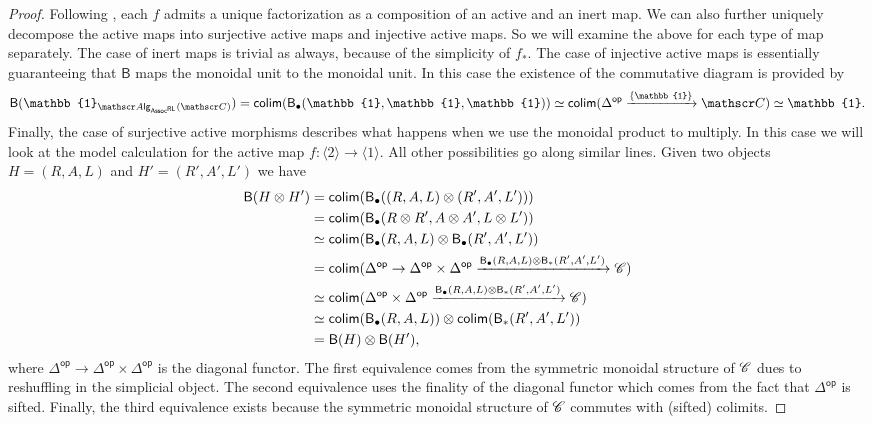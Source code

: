 \documentclass[../text]{subfiles}
\begin{document}
\begin{proof}
    Following \cite[rem.2.1.2.2]{lurie_ha}, each $f$ admits a unique factorization as a composition of an active and an inert map. We can also further uniquely decompose the active maps into surjective active maps and injective active maps. So we will examine the above for each type of map separately. The case of inert maps is trivial as always, because of the simplicity of $f_*$. The case of injective active maps is essentially guaranteeing that $\mathsf{B}$ maps the monoidal unit to the monoidal unit. In this case the existence of the commutative diagram is provided by
    \begin{equation}
        \mathsf{B} (\mathbb{1}_{\alg{\mathsf{Assoc^{RL}}} (\catC)}) = \mathsf{colim} (\mathsf{B}_{\bullet} (\mathbb{1},\mathbb{1},\mathbb{1})) \simeq \mathsf{colim} (\Delta^{\mathsf{op}} \xrightarrow{\{ \mathbb{1}\}} \catC) \simeq \mathbb{1}.
    \end{equation}
    Finally, the case of surjective active morphisms describes what happens when we use the monoidal product to multiply. In this case we will look at the model calculation for the active map $f: \langle 2 \rangle \xrightarrow{} \langle 1 \rangle$. All other possibilities go along similar lines. Given two objects $H = (R,A,L)$ and $H' = (R',A',L')$ we have 
    \begin{align}
        \mathsf{B}(H \otimes H') &= \mathsf{colim} (\mathsf{B}_{\bullet} ((R,A,L) \otimes (R',A',L')))\notag\\
        &= \mathsf{colim} (\mathsf{B}_{\bullet} (R \otimes R', A \otimes A', L \otimes L'))\notag\\
        &\simeq \mathsf{colim} (\mathsf{B}_{\bullet} (R, A, L) \otimes \mathsf{B}_{\bullet} (R', A', L'))\notag\\
        &= \mathsf{colim} (\Delta^{\mathsf{op}} \rightarrow \Delta^{\mathsf{op}} \times \Delta^{\mathsf{op}} \xrightarrow{\mathsf{B}_{\bullet} (R, A, L) \otimes \mathsf{B}_{*} (R', A', L')} \mathscr{C})\notag\\
        &\simeq \mathsf{colim} (\Delta^{\mathsf{op}} \times \Delta^{\mathsf{op}} \xrightarrow{\mathsf{B}_{\bullet} (R, A, L) \otimes \mathsf{B}_{*} (R', A', L')} \mathscr{C})\notag\\
        &\simeq \mathsf{colim} (\mathsf{B}_{\bullet} (R, A, L)) \otimes \mathsf{colim} (\mathsf{B}_{*} (R', A', L'))\notag\\
        &= \mathsf{B}(H) \otimes \mathsf{B}(H'),
    \end{align}
    where $\Delta^{\mathsf{op}} \rightarrow \Delta^{\mathsf{op}} \times \Delta^{\mathsf{op}}$ is the diagonal functor. The first equivalence comes from the symmetric monoidal structure of $\mathscr{C}$ dues to reshuffling in the simplicial object. The second equivalence uses the finality of the diagonal functor which comes from the fact that $\Delta^{\mathsf{op}}$ is sifted. Finally, the third equivalence exists because the symmetric monoidal structure of $\mathscr{C}$ commutes with (sifted) colimits.
\end{proof}
\end{document}
